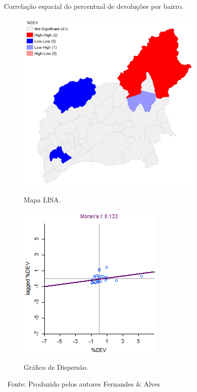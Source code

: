 \begin{figure}[htb]
     \caption{Correlação espacial do percentual de devoluções por bairro.}
     \begin{subfigure}{.49\textwidth}
         \centering
         \caption{Mapa LISA.}
         \includegraphics[height=0.75\textwidth]{images/5_emp_bebidas/geoda/BairrosOSM_Corrigidos_DEV_lisa.png}
         \label{fig:AMBEV_LISA_DEV}
     \end{subfigure}
     \begin{subfigure}{.49\textwidth}
       \centering
       \caption{Gráfico de Dispersão.}
       \includegraphics[height=0.75\textwidth]{images/5_emp_bebidas/geoda/BairrosOSM_Corrigidos_DEV_sct.png}
       \label{fig:AMBEV_SCT_DEV}
     \end{subfigure}
     \caption*{\ Fonte: Produzido pelos autores Fernandes \& Alves}
 \end{figure} %

